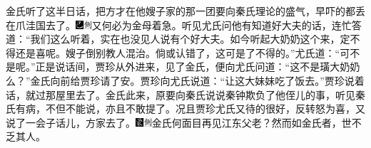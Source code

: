 金氏听了这半日话，把方才在他嫂子家的那一团要向秦氏理论的盛气，早吓的都丢在爪洼国去了。{\includegraphics[width=3mm]{../Images/00003}\includegraphics[width=3mm]{../Images/00011}\footnotesize \kaishu 又何必为金母着急。}听见尤氏问他有知道好大夫的话，连忙答道：“我们这么听着，实在也没见人说有个好大夫。如今听起大奶奶这个来，定不得还是喜呢。嫂子倒别教人混治。倘或认错了，这可是了不得的。”尤氏道：“可不是呢。”正是说话间，贾珍从外进来，见了金氏，便向尤氏问道：“这不是璜大奶奶么？”金氏向前给贾珍请了安。贾珍向尤氏说道：“让这大妹妹吃了饭去。”贾珍说着话，就过那屋里去了。金氏此来，原要向秦氏说说秦钟欺负了他侄儿的事，听见秦氏有病，不但不能说，亦且不敢提了。况且贾珍尤氏又待的很好，反转怒为喜，又说了一会子话儿，方家去了。{\includegraphics[width=3mm]{../Images/00006}\includegraphics[width=3mm]{../Images/00011}\footnotesize \kaishu 金氏何面目再见江东父老？然而如金氏者，世不乏其人。}


